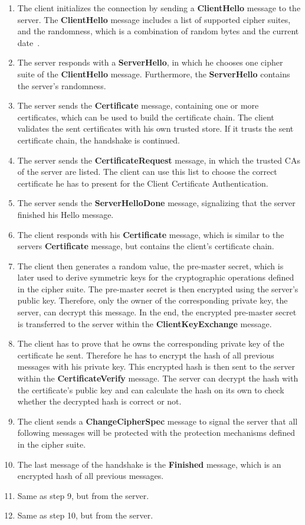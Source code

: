 \begin{enumerate}
	\item The client initializes the connection by sending a \textbf{ClientHello} message to the server.
		The \textbf{ClientHello} message includes a list of supported cipher suites, and the randomness, which is a combination of random bytes and the current date~\cite{mediumtls}.
	\item The server responds with a \textbf{ServerHello}, in which he chooses one cipher suite of the \textbf{ClientHello} message.
		Furthermore, the \textbf{ServerHello} contains the server's randomness.
	\item The server sends the \textbf{Certificate} message, containing one or more certificates, which can be used to build the certificate chain.
		The client validates the sent certificates with his own trusted store.
		If it trusts the sent certificate chain, the handshake is continued.
	\item The server sends the \textbf{CertificateRequest} message, in which the trusted CAs of the server are listed.
		The client can use this list to choose the correct certificate he has to present for the Client Certificate Authentication.
	\item The server sends the \textbf{ServerHelloDone} message, signalizing that the server finished his Hello message.
	\item The client responds with his \textbf{Certificate} message, which is similar to the servers \textbf{Certificate} message, but contains the client's certificate chain.
	\item The client then generates a random value, the pre-master secret, which is later used to derive symmetric keys for the cryptographic operations defined in the cipher suite.
		The pre-master secret is then encrypted using the server's public key.
		Therefore, only the owner of the corresponding private key, the server, can decrypt this message.
		In the end, the encrypted pre-master secret is transferred to the server within the \textbf{ClientKeyExchange} message.
	\item The client has to prove that he owns the corresponding private key of the certificate he sent.
		Therefore he has to encrypt the hash of all previous messages with his private key.
		This encrypted hash is then sent to the server within the \textbf{CertificateVerify} message.
		The server can decrypt the hash with the certificate's public key and can calculate the hash on its own to check whether the decrypted hash is correct or not.
	\item The client sends a \textbf{ChangeCipherSpec} message to signal the server that all following messages will be protected with the protection mechanisms defined in the cipher suite.
	\item The last message of the handshake is the \textbf{Finished} message, which is an encrypted hash of all previous messages.
	\item Same as step 9, but from the server.
	\item Same as step 10, but from the server.
\end{enumerate}
